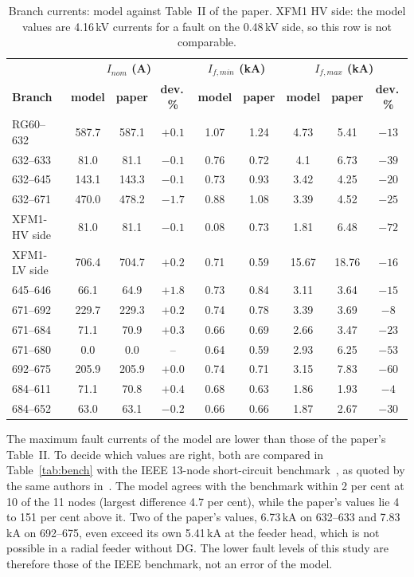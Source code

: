 \documentclass[12pt,a4paper]{article}
\begin{document}
\begin{table}[H]
\centering\footnotesize
\begin{tabular}{|l|c|c|c|c|c|c|c|c|}
\hline
 & \multicolumn{3}{c|}{\textbf{$I_{nom}$ (A)}} & \multicolumn{2}{c|}{\textbf{$I_{f,min}$ (kA)}} & \multicolumn{3}{c|}{\textbf{$I_{f,max}$ (kA)}} \\
\textbf{Branch} & \textbf{model} & \textbf{paper} & \textbf{dev.\,\%} & \textbf{model} & \textbf{paper} & \textbf{model} & \textbf{paper} & \textbf{dev.\,\%} \\ \hline
RG60--632 & 587.7 & 587.1 & $+0.1$ & 1.07 & 1.24 & 4.73 & 5.41 & $-13$ \\ \hline
632--633 & 81.0 & 81.1 & $-0.1$ & 0.76 & 0.72 & 4.1 & 6.73 & $-39$ \\ \hline
632--645 & 143.1 & 143.3 & $-0.1$ & 0.73 & 0.93 & 3.42 & 4.25 & $-20$ \\ \hline
632--671 & 470.0 & 478.2 & $-1.7$ & 0.88 & 1.08 & 3.39 & 4.52 & $-25$ \\ \hline
XFM1-HV side & 81.0 & 81.1 & $-0.1$ & 0.08 & 0.73 & 1.81 & 6.48 & $-72$ \\ \hline
XFM1-LV side & 706.4 & 704.7 & $+0.2$ & 0.71 & 0.59 & 15.67 & 18.76 & $-16$ \\ \hline
645--646 & 66.1 & 64.9 & $+1.8$ & 0.73 & 0.84 & 3.11 & 3.64 & $-15$ \\ \hline
671--692 & 229.7 & 229.3 & $+0.2$ & 0.74 & 0.78 & 3.39 & 3.69 & $-8$ \\ \hline
671--684 & 71.1 & 70.9 & $+0.3$ & 0.66 & 0.69 & 2.66 & 3.47 & $-23$ \\ \hline
671--680 & 0.0 & 0.0 & -- & 0.64 & 0.59 & 2.93 & 6.25 & $-53$ \\ \hline
692--675 & 205.9 & 205.9 & $+0.0$ & 0.74 & 0.71 & 3.15 & 7.83 & $-60$ \\ \hline
684--611 & 71.1 & 70.8 & $+0.4$ & 0.68 & 0.63 & 1.86 & 1.93 & $-4$ \\ \hline
684--652 & 63.0 & 63.1 & $-0.2$ & 0.66 & 0.66 & 1.87 & 2.67 & $-30$ \\ \hline
\end{tabular}
\caption{Branch currents: model against Table~II of the paper. XFM1 HV side: the model values are 4.16\,kV currents
for a fault on the 0.48\,kV side, so this row is not comparable.}
\label{tab:e2}
\end{table}

The maximum fault currents of the model are lower than those of the paper's Table~II. To decide which values are
right, both are compared in Table~\ref{tab:bench} with the IEEE 13-node short-circuit benchmark~\cite{kersting2012},
as quoted by the same authors in~\cite{yousaf2020}. The model agrees with the benchmark within 2 per cent at 10
of the 11 nodes (largest difference 4.7 per cent), while the paper's values lie 4 to 151 per cent above it.
Two of the paper's values, 6.73\,kA on 632--633 and 7.83\,kA on 692--675, even exceed its own 5.41\,kA at the feeder
head, which is not possible in a radial feeder without DG. The lower fault levels of this study are therefore
those of the IEEE benchmark, not an error of the model.
\end{document}
